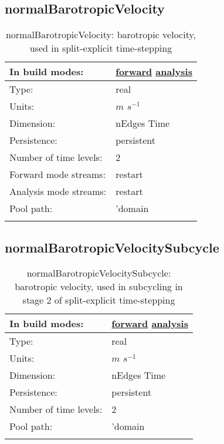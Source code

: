 \subsection[normalBarotropicVelocity]{normalBarotropicVelocity}
\label{subsec:var_sec_state_normalBarotropicVelocity}
\begin{center}
\begin{longtable}{| p{2.0in} | p{4.0in} |}
        \hline 
        In build modes: & \hyperref[subsec:forward_var_tab_state]{forward} \hyperref[subsec:analysis_var_tab_state]{analysis} \\
        \hline 
        Type: & real \\
        \hline 
        Units: & $m$ $s^{-1}$ \\
        \hline 
        Dimension: & nEdges Time \\
        \hline 
        Persistence: & persistent \\
        \hline 
        Number of time levels: & 2 \\
        \hline 
		 Forward mode streams: &  restart \\
        \hline 
		 Analysis mode streams: &  restart \\
        \hline 
            Pool path: & 'domain %
 \\
		 \hline 
    \caption{normalBarotropicVelocity: barotropic velocity, used in split-explicit time-stepping}
\end{longtable}
\end{center}
\subsection[normalBarotropicVelocitySubcycle]{normalBarotropicVelocitySubcycle}
\label{subsec:var_sec_state_normalBarotropicVelocitySubcycle}
\begin{center}
\begin{longtable}{| p{2.0in} | p{4.0in} |}
        \hline 
        In build modes: & \hyperref[subsec:forward_var_tab_state]{forward} \hyperref[subsec:analysis_var_tab_state]{analysis} \\
        \hline 
        Type: & real \\
        \hline 
        Units: & $m$ $s^{-1}$ \\
        \hline 
        Dimension: & nEdges Time \\
        \hline 
        Persistence: & persistent \\
        \hline 
        Number of time levels: & 2 \\
        \hline 
            Pool path: & 'domain %
 \\
		 \hline 
    \caption{normalBarotropicVelocitySubcycle: barotropic velocity, used in subcycling in stage 2 of split-explicit time-stepping}
\end{longtable}
\end{center}
